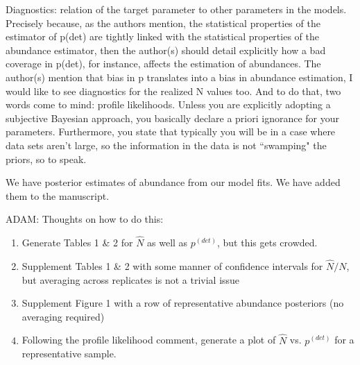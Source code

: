 \documentclass[12pt]{article}
\renewenvironment{quote}  %
              {\list{}{\rightmargin\leftmargin}\normalfont%
               \item\relax}
              {\endlist}
\newcommand{\adam}[1]{{\color{blue} ADAM: #1}}
\newcommand{\pdet}{p^{(det)}}
\begin{document}
Diagnostics: relation of the target parameter to other parameters in the models. Precisely because, as the authors mention, the statistical properties of the estimator of p(det) are tightly linked with the statistical properties of the abundance estimator, then the author(s) should detail explicitly how a bad coverage in p(det), for instance, affects the estimation of abundances. The author(s) mention that bias in p translates into a bias in abundance estimation, I would like to see diagnostics for the realized N values too. And to do that, two words come to mind: profile likelihoods. Unless you are explicitly adopting a subjective Bayesian approach, you basically declare a priori ignorance for your parameters.  Furthermore, you state that typically you will be in a case where data sets aren't large, so the information in the data is not ``swamping" the priors, so to speak.
\begin{quote}
We have posterior estimates of abundance from our model fits.  We have added them to the manuscript.\\
\adam{Thoughts on how to do this:
\begin{enumerate}
\item Generate Tables 1 \& 2 for $\hat{N}$ as well as $\pdet$, but this gets crowded.
\item Supplement Tables 1 \& 2 with some manner of confidence intervals for $\hat{N} / N$, but averaging across replicates is not a trivial issue
\item Supplement Figure 1 with a row of representative abundance posteriors (no averaging required)
\item Following the profile likelihood comment, generate a plot of $\hat{N}$ vs. $\pdet$ for a representative sample.
\end{enumerate}
}
\end{quote}
\end{document}
